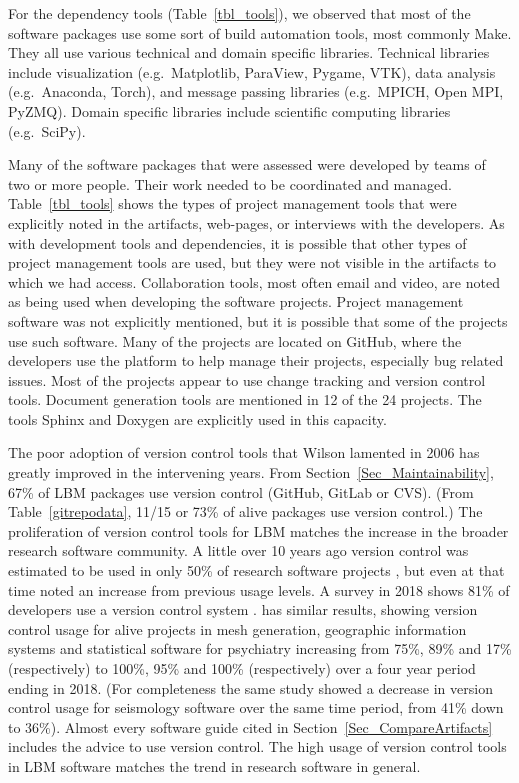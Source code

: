 \documentclass[runningheads]{llncs}
\begin{document}
For the dependency tools (Table~\ref{tbl_tools}), we observed that most of the
software packages use some sort of build automation tools, most commonly Make.
They all use various technical and domain specific libraries. Technical
libraries include visualization (e.g.\ Matplotlib, ParaView, Pygame, VTK), data
analysis (e.g.\ Anaconda, Torch), and message passing libraries (e.g.\ MPICH,
Open MPI, PyZMQ). Domain specific libraries include scientific computing
libraries (e.g.\ SciPy).

Many of the software packages that were assessed were developed by teams of two
or more people. Their work needed to be coordinated and managed.
Table~\ref{tbl_tools} shows the types of project management tools that were
explicitly noted in the artifacts, web-pages, or interviews with the developers.
As with development tools and dependencies, it is possible that other types of
project management tools are used, but they were not visible in the artifacts to
which we had access.  Collaboration tools, most often email and video, are noted
as being used when developing the software projects. Project management software
was not explicitly mentioned, but it is possible that some of the projects use
such software. Many of the projects are located on GitHub, where the developers
use the platform to help manage their projects, especially bug related issues.
Most of the projects appear to use change tracking and version control tools.
Document generation tools are mentioned in 12 of the 24 projects. The tools
Sphinx and Doxygen are explicitly used in this capacity.

The poor adoption of version control tools that Wilson lamented in 2006
\cite{Wilson2006} has greatly improved in the intervening years.  From
Section~\ref{Sec_Maintainability}, 67\% of LBM packages use version control
(GitHub, GitLab or CVS).  (From Table~\ref{gitrepodata}, 11/15 or 73\% of alive
packages use version control.)  The proliferation of version control tools for
LBM matches the increase in the broader research software community.  A little
over 10 years ago version control was estimated to be used in only 50\% of
research software projects \cite{Nguyen-HoanEtAl2010}, but even at that time
\cite{Nguyen-HoanEtAl2010} noted an increase from previous usage levels. A
survey in 2018 shows 81\% of developers use a version control system
\cite{AlNoamanyAndBorghi2018}.  \cite{Smith2018} has similar results, showing
version control usage for alive projects in mesh generation, geographic
information systems and statistical software for psychiatry increasing from
75\%, 89\% and 17\% (respectively) to 100\%, 95\% and 100\% (respectively) over
a four year period ending in 2018.  (For completeness the same study showed a
decrease in version control usage for seismology software over the same time
period, from 41\% down to 36\%).  Almost every software guide cited in
Section~\ref{Sec_CompareArtifacts} includes the advice to use version control.
The high usage of version control tools in LBM software matches the trend in
research software in general.
\end{document}
